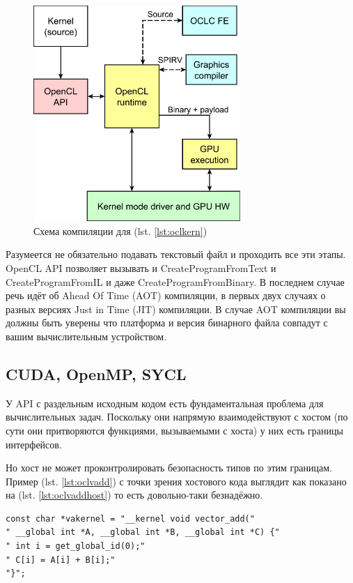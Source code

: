 \documentclass[a4paper,12pt,oneside]{article}
\begin{document}
\begin{figure}
\centering
\includegraphics[width=0.7\textwidth]{pictures/ocl-compilation-scheme.pdf}
\caption{Схема компиляции для (lst. \ref{lst:oclkern})}
\label{fig:oclkern}
\end{figure}

Разумеется не обязательно подавать текстовый файл и проходить все эти этапы.
OpenCL API позволяет вызывать и CreateProgramFromText и CreateProgramFromIL и даже CreateProgramFromBinary.
В последнем случае речь идёт об Ahead Of Time (AOT) компиляции, в первых двух случаях о разных версиях Just in Time (JIT) компиляции.
В случае AOT компиляции вы должны быть уверены что платформа и версия бинарного файла совпадут с вашим вычислительным устройством.

\subsection{CUDA, OpenMP, SYCL}\label{subsec:typesafety}

У API с раздельным исходным кодом есть фундаментальная проблема для вычислительных задач.
Поскольку они напрямую взаимодействуют с хостом (по сути они притворяются функциями, вызываемыми с хоста) у них есть границы интерфейсов.

Но хост не может проконтролировать безопасность типов по этим границам. Пример (lst. \ref{lst:oclvadd}) с точки зрения хостового кода выглядит как показано на (lst. \ref{lst:oclvaddhost}) то есть довольно-таки безнадёжно.

\begin{lstlisting}[caption={Векторное сложение, OpenCL c точки зрения хоста},label={lst:oclvaddhost}]
const char *vakernel = "__kernel void vector_add("
" __global int *A, __global int *B, __global int *C) {"
" int i = get_global_id(0);"
" C[i] = A[i] + B[i];"
"}";
\end{lstlisting}
\end{document}
